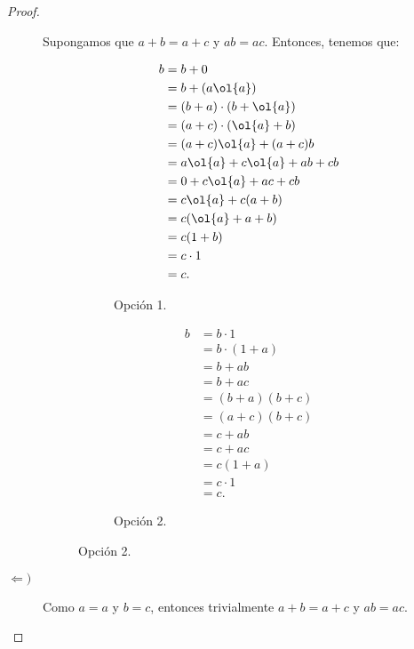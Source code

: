 \begin{ejercicio}
\begin{proof}
\begin{description}
            Supongamos que $a+b=a+c$ y $ab=ac$. Entonces, tenemos que:
            \begin{figure}[H]
                \centering
                \begin{subfigure}[c]{0.4\linewidth}
                    \centering
                    \begin{align*}
                        b &= b + 0\\
                        &= b + (a\ol{a})\\
                        &= (b+a) \cdot (b+\ol{a})\\
                        &= (a+c) \cdot (\ol{a}+b)\\
                        &= (a+c)\ol{a} + (a+c)b\\
                        &= a\ol{a} + c\ol{a} + ab + cb\\
                        &= 0 + c\ol{a} + ac + cb\\
                        &= c\ol{a} + c(a+b)\\
                        &= c(\ol{a} + a + b)\\
                        &= c(1+b)\\
                        &= c\cdot 1\\
                        &= c.
                    \end{align*}
                    \caption{Opción 1.}
                \end{subfigure}\hfill
                \begin{subfigure}[c]{0.4\linewidth}
                    \centering
                    \begin{align*}
                        b &= b\cdot 1\\
                        &= b\cdot (1+a) \\
                        &= b+ab\\
                        &= b+ac\\
                        &= (b+a)(b+c)\\
                        &= (a+c)(b+c)\\
                        &= c+ab\\
                        &= c+ac\\
                        &= c(1+a)\\
                        &= c\cdot 1\\
                        &= c.
                    \end{align*}
                    \caption{Opción 2.}
                \end{subfigure}
            \end{figure}

            \item[$\Longleftarrow)$]
            
            Como $a=a$ y $b=c$, entonces trivialmente $a+b=a+c$ y $ab=ac$.
        \end{description}
    \end{proof}
\end{ejercicio}

